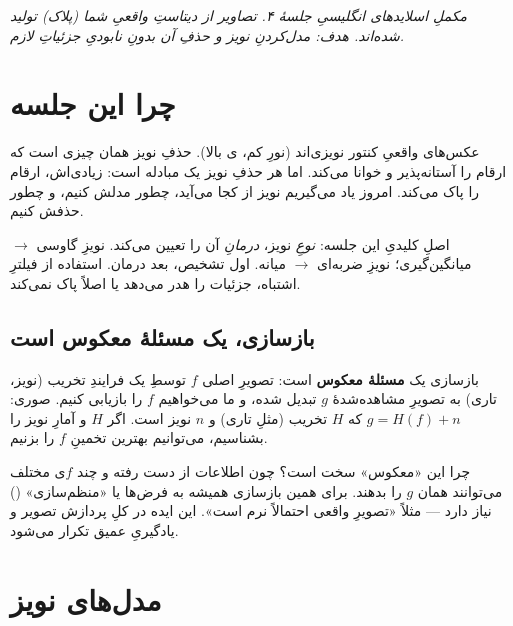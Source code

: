 \documentclass[12pt,a4paper]{article}
\begin{document}

{\small\itshape مکملِ اسلایدهای انگلیسیِ جلسهٔ ۴. تصاویر از دیتاستِ واقعیِ شما (پلاک) تولید شده‌اند. هدف: مدل‌کردنِ نویز و حذفِ آن بدونِ نابودیِ جزئیاتِ لازم.}

\vspace{0.5cm}
\tableofcontents
\vspace{1cm}

\section{چرا این جلسه}

عکس‌های واقعیِ کنتور نویزی‌اند (نورِ کم، ی بالا). حذفِ نویز همان چیزی است که ارقام را
آستانه‌پذیر و خوانا می‌کند. اما هر حذفِ نویز یک مبادله است: زیادی‌اش، ارقام را پاک می‌کند.
امروز یاد می‌گیریم نویز از کجا می‌آید، چطور مدلش کنیم، و چطور حذفش کنیم.

\begin{nokte}
اصلِ کلیدیِ این جلسه: \emph{نوعِ} نویز، \emph{درمانِ} آن را تعیین می‌کند. نویزِ گاوسی
$\rightarrow$ میانگین‌گیری؛ نویزِ ضربه‌ای $\rightarrow$ میانه. اول تشخیص، بعد درمان. استفاده از
فیلترِ اشتباه، جزئیات را هدر می‌دهد یا اصلاً پاک نمی‌کند.
\end{nokte}

\subsection{بازسازی، یک مسئلهٔ معکوس است}

بازسازی یک \textbf{مسئلهٔ معکوس} است: تصویرِ اصلی $f$ توسطِ یک فرایندِ تخریب (نویز، تاری) به تصویرِ
مشاهده‌شدهٔ $g$ تبدیل شده، و ما می‌خواهیم $f$ را بازیابی کنیم. صوری: $g = H(f) + n$ که $H$ تخریب
(مثلِ تاری) و $n$ نویز است. اگر $H$ و آمارِ نویز را بشناسیم، می‌توانیم بهترین تخمینِ $f$ را بزنیم.

\begin{nokte}
چرا این «معکوس» سخت است؟ چون اطلاعات از دست رفته و چند $f$ی مختلف می‌توانند همان $g$ را بدهند.
برای همین بازسازی همیشه به فرض‌ها یا «منظم‌سازی» () نیاز دارد — مثلاً «تصویرِ
واقعی احتمالاً نرم است». این ایده در کلِ پردازش تصویر و یادگیریِ عمیق تکرار می‌شود.
\end{nokte}

\section{مدل‌های نویز}
\end{document}
